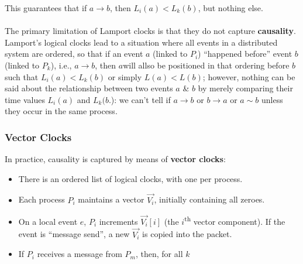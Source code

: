 \documentclass[a4paper,11pt]{article}
\begin{document}
This guarantees that if $a \rightarrow b$, then $L_i(a) < L_k(b)$, but nothing else.
\\\\
The primary limitation of Lamport clocks is that they do not capture \textbf{causality}.
Lamport's logical clocks lead to a situation where all events in a distributed system are ordered, so that if an event $a$ (linked to $P_i$) ``happened before''  event $b$ (linked to $P_k$), i.e., $a \rightarrow b$, then $a$will allso be positioned in that ordering before $b$ such that $L_i(a) < L_k(b)$ or simply $L(a) < L(b)$;
however, nothing can be said about the relationship between two events $a$ \& $b$ by merely comparing their time values $L_i(a)$ and $L_k(b$.): we can't tell if $a \rightarrow b$ or $b \rightarrow a$ or $a \sim b$ unless they occur in the same process.

\subsubsection{Vector Clocks}
In practice, causality is captured by means of \textbf{vector clocks}:
\begin{itemize}
    \item   There is an ordered list of logical clocks, with one per process.
    \item   Each process $P_i$ maintains a vector $\vec{V_i}$, initially containing all zeroes.
    \item   On a local event $e$, $P_i$ increments $\vec{V_i}[i]$ (the $i$\textsuperscript{th} vector component).
            If the event is ``message send'', a new $\vec{V_i}$ is copied into the packet.
    \item   If $P_i$ receives a message from $P_m$, then, for all $k$
\end{itemize}
\end{document}
